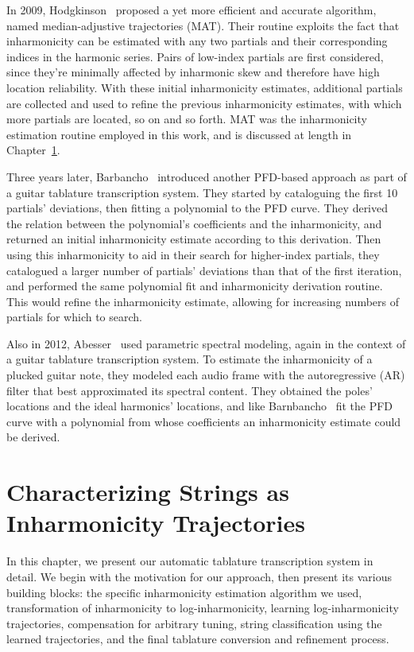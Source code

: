 \documentclass[12pt]{cmuthesis}
\begin{document}
In 2009, Hodgkinson~\cite{hodgkinson2009} proposed a yet more efficient and accurate algorithm, named median-adjustive trajectories (MAT). Their routine exploits the fact that inharmonicity can be estimated with any two partials and their corresponding indices in the harmonic series. Pairs of low-index partials are first considered, since they're minimally affected by inharmonic skew and therefore have high location reliability. With these initial inharmonicity estimates, additional partials are collected and used to refine the previous inharmonicity estimates, with which more partials are located, so on and so forth. MAT was the inharmonicity estimation routine employed in this work, and is discussed at length in Chapter~\ref{chap:method}.

Three years later, Barbancho~\cite{barbanchoi2012} introduced another PFD-based approach as part of a guitar tablature transcription system. They started by cataloguing the first 10 partials' deviations, then fitting a polynomial to the PFD curve. They derived the relation between the polynomial's coefficients and the inharmonicity, and returned an initial inharmonicity estimate according to this derivation. Then using this inharmonicity to aid in their search for higher-index partials, they catalogued a larger number of partials' deviations than that of the first iteration, and performed the same polynomial fit and inharmonicity derivation routine. This would refine the inharmonicity estimate, allowing for increasing numbers of partials for which to search.

Also in 2012, Abesser~\cite{abesser2012} used parametric spectral modeling, again in the context of a guitar tablature transcription system. To estimate the inharmonicity of a plucked guitar note, they modeled each audio frame with the autoregressive (AR) filter that best approximated its spectral content. They obtained the poles' locations and the ideal harmonics' locations, and like Barnbancho~\cite{barbanchoi2012} fit the PFD curve with a polynomial from whose coefficients an inharmonicity estimate could be derived.



\noindent
\chapter{Characterizing Strings as Inharmonicity Trajectories}
\label{chap:method}
In this chapter, we present our automatic tablature transcription system in detail. We begin with the motivation for our approach, then present its various building blocks: the specific inharmonicity estimation algorithm we used, transformation of inharmonicity to log-inharmonicity, learning log-inharmonicity trajectories, compensation for arbitrary tuning, string classification using the learned trajectories, and the final tablature conversion and refinement process.
\end{document}
